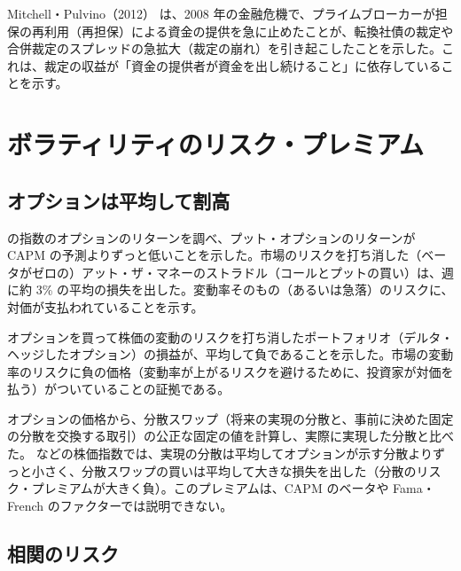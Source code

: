 Mitchell・Pulvino（2012）\cite{mitchellpulvino2012} は、2008 年の金融危機で、プライムブローカーが担保の再利用（再担保）による資金の提供を急に止めたことが、転換社債の裁定や合併裁定のスプレッドの急拡大（裁定の崩れ）を引き起こしたことを示した。これは、裁定の収益が「資金の提供者が資金を出し続けること」に依存していることを示す。

\section{ボラティリティのリスク・プレミアム}

\subsection{オプションは平均して割高}

\begin{paperbox}
\SP{} の指数のオプションのリターンを調べ、プット・オプションのリターンが CAPM の予測よりずっと低いことを示した。市場のリスクを打ち消した（ベータがゼロの）アット・ザ・マネーのストラドル（コールとプットの買い）は、週に約 3\% の平均の損失を出した。変動率そのもの（あるいは急落）のリスクに、対価が支払われていることを示す。
\end{paperbox}

\begin{paperbox}
オプションを買って株価の変動のリスクを打ち消したポートフォリオ（デルタ・ヘッジしたオプション）の損益が、平均して負であることを示した。市場の変動率のリスクに負の価格（変動率が上がるリスクを避けるために、投資家が対価を払う）がついていることの証拠である。
\end{paperbox}

\begin{paperbox}
オプションの価格から、分散スワップ（将来の実現の分散と、事前に決めた固定の分散を交換する取引）の公正な固定の値を計算し、実際に実現した分散と比べた。\SP{} などの株価指数では、実現の分散は平均してオプションが示す分散よりずっと小さく、分散スワップの買いは平均して大きな損失を出した（分散のリスク・プレミアムが大きく負）。このプレミアムは、CAPM のベータや Fama・French のファクターでは説明できない。
\end{paperbox}

\subsection{相関のリスク}

